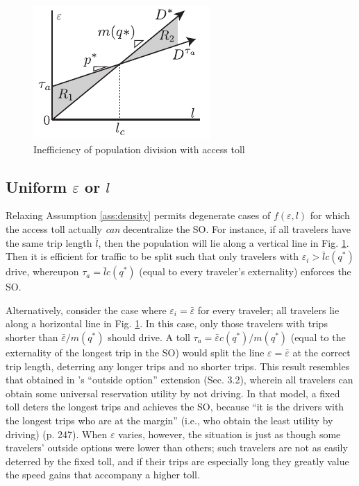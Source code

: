 \documentclass[preprint,authoryear]{elsarticle}
\newcommand{\taua}{\tau_a}
\newcommand{\ve}{\varepsilon}
\begin{document}
\begin{figure}
	\centering
	\includegraphics[width=.5\columnwidth]{img/mode-split2}
	\caption{Inefficiency of population division with access toll}
	\label{fig:mode-split}
\end{figure}

\subsection{Uniform $\ve$ or $l$}

Relaxing Assumption \ref{ass:density} permits degenerate cases of $f(\ve,l)$ for which the access toll actually \emph{can} decentralize the SO. For instance, if all travelers have the same trip length $\bar{l}$, then the population will lie along a vertical line in Fig. \ref{fig:mode-split}. Then it is efficient for traffic to be split such that only travelers with $\ve_i>\bar{l}c(q^*)$ drive, whereupon $\tau_a=\bar{l}c(q^*)$ (equal to every traveler's externality) enforces the SO. 

Alternatively, consider the case where $\ve_i=\bar{\ve}$ for every traveler; all travelers lie along a horizontal line in Fig. \ref{fig:mode-split}. In this case, only those travelers with trips shorter than $\bar{\ve}/m(q^*)$ should drive. A toll $\taua = \bar{\ve} c(q^*)/m(q^*)$ (equal to the externality of the longest trip in the SO) would split the line $\ve=\bar{\ve}$ at the correct trip length, deterring any longer trips and no shorter trips. This result resembles that obtained in \citet{Fosgerau2015}'s ``outside option'' extension (Sec. 3.2), wherein all travelers can obtain some universal reservation utility by not driving. In that model, a fixed toll deters the longest trips and achieves the SO, because ``it is the drivers with the longest trips who are at the margin'' (i.e., who obtain the least utility by driving) (p. 247). When $\ve$ varies, however, the situation is just as though some travelers' outside options were lower than others; such travelers are not as easily deterred by the fixed toll, and if their trips are especially long they greatly value the speed gains that accompany a higher toll.
\end{document}
